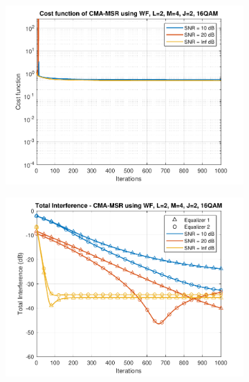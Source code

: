 \begin{figure}
\begin{subfigure}[b]{0.45\textwidth}
		\includegraphics[width=\linewidth]{./figs/BF_WF_MSR_cost_16QAM_L=2_M=4_J=2_K=1000.pdf}
		\label{fig:wf_msr_cost16}
	\end{subfigure}
	\begin{subfigure}[b]{0.45\textwidth}
		\includegraphics[width=\linewidth]{./figs/BF_WF_MSR_TI_16QAM_L=2_M=4_J=2_K=1000.pdf}
		\label{fig:wf_msr_ti16}
	\end{subfigure}
	\begin{subfigure}[b]{0.45\textwidth}

\end{subfigure}
\end{figure}
